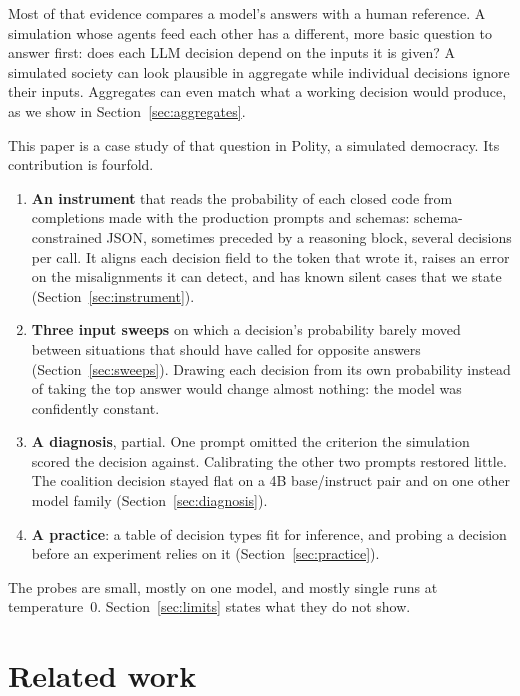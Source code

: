 \documentclass[11pt]{article}
\begin{document}
Most of that evidence compares a model's answers with a human reference. A simulation whose
agents feed each other has a different, more basic question to answer first: does each LLM
decision depend on the inputs it is given? A simulated society can look plausible in aggregate
while individual decisions ignore their inputs. Aggregates can even match what a working
decision would produce, as we show in Section~\ref{sec:aggregates}.

This paper is a case study of that question in Polity, a simulated democracy. Its contribution is
fourfold.
\begin{enumerate}
  \item \textbf{An instrument} that reads the probability of each closed code from completions
    made with the production prompts and schemas: schema-constrained JSON, sometimes preceded by
    a reasoning block, several decisions per call. It aligns each decision field to the token
    that wrote it, raises an error on the misalignments it can detect, and has known silent cases
    that we state (Section~\ref{sec:instrument}).
  \item \textbf{Three input sweeps} on which a decision's probability barely moved between
    situations that should have called for opposite answers (Section~\ref{sec:sweeps}). Drawing
    each decision from its own probability instead of taking the top answer would change
    almost nothing: the model was confidently constant.
  \item \textbf{A diagnosis}, partial. One prompt omitted the criterion the simulation scored
    the decision against. Calibrating the other two prompts restored little. The coalition
    decision stayed flat on a 4B base/instruct pair and on one other model family
    (Section~\ref{sec:diagnosis}).
  \item \textbf{A practice}: a table of decision types fit for inference, and probing a
    decision before an experiment relies on it (Section~\ref{sec:practice}).
\end{enumerate}
The probes are small, mostly on one model, and mostly single runs at temperature~0.
Section~\ref{sec:limits} states what they do not show.

\section{Related work}
\end{document}
